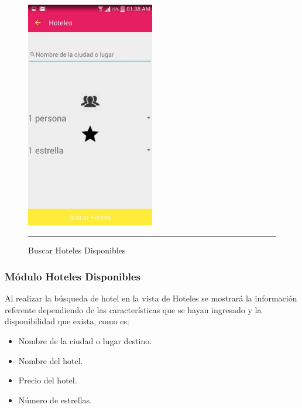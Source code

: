 \begin{figure}[h]
	\centering
		\includegraphics[width=0.5\textwidth]{Figuras/hoteles.jpg}
		\rule{30em}{0.5pt}
	\caption[Buscar Hoteles Disponibles]{Buscar Hoteles Disponibles}
	\label{fig:buscarHoteles}
\end{figure}
\clearpage

\subsubsection{Módulo Hoteles Disponibles}
Al realizar la búsqueda de hotel en la vista de Hoteles se mostrará la información 
referente dependiendo de las características que se hayan ingresado y la disponibilidad que exista, como es:
\begin{itemize}
\item Nombre de la ciudad o lugar destino.
\item Nombre del hotel.
\item Precio del hotel.
\item Número de estrellas.
\end{itemize}

